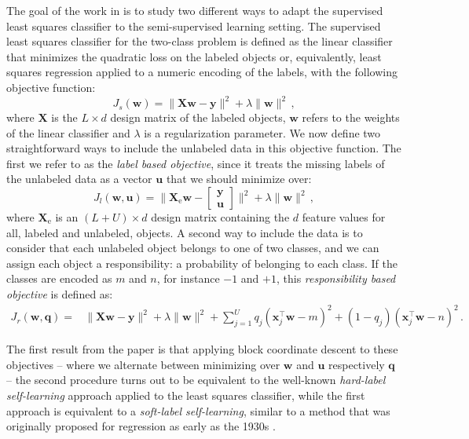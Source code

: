 \documentclass[twoside]{memoir}\usepackage[]{graphicx}\usepackage{xcolor}
\renewcommand{\cite}{\citep}
\newcommand{\Xe}{\mathbf{X}_\mathrm{e}  }
\begin{document}
The goal of the work in \cite{Krijthe2016a} is to study two different ways to adapt the supervised least squares classifier to the semi-supervised learning setting. The supervised least squares classifier for the two-class problem is defined as the linear classifier that minimizes the quadratic loss on the labeled objects or, equivalently, least squares regression applied to a numeric encoding of the labels, with the following objective function:
\begin{equation}
J_s(\mathbf{w}) = \| \mathbf{X} \mathbf{w}-\mathbf{y} \|^2 + \lambda \|\mathbf{w} \|^2 \,, \nonumber
\end{equation}
where $\mathbf{X}$ is the $L \times d$ design matrix of the labeled objects, $\mathbf{w}$ refers to the weights of the linear classifier and $\lambda$ is a regularization parameter. We now define two straightforward ways to include the unlabeled data in this objective function. The first we refer to as the \emph{label based objective}, since it treats the missing labels of the unlabeled data as a vector $\mathbf{u}$ that we should minimize over:
$$
J_l(\mathbf{w},\mathbf{u}) = \| \Xe \mathbf{w}-\begin{bmatrix} \mathbf{y} \\ \mathbf{u} \end{bmatrix} \|^2 + \lambda \|\mathbf{w} \|^2 \,,
$$
where $\Xe$ is an $(L+U) \times d$ design matrix containing the $d$ feature values for all, labeled and unlabeled, objects.
A second way to include the data is to consider that each unlabeled object belongs to one of two classes, and we can assign each object a responsibility: a probability of belonging to each class. If the classes are encoded as $m$ and $n$, for instance $-1$ and $+1$, this \emph{responsibility based objective} is defined as:
\begin{align}
J_r(\mathbf{w},\mathbf{q}) = & \| \mathbf{X} \mathbf{w}-\mathbf{y} \|^2 + \lambda \|\mathbf{w} \|^2 \nonumber + \sum_{j=1}^{U}  q_j (\mathbf{x}_j^\top \mathbf{w} - m)^2  + (1-q_j) (\mathbf{x}_j^\top \mathbf{w} - n)^2 \,. \nonumber
\end{align}

The first result from the paper is that applying block coordinate descent to these objectives -- where we alternate between minimizing over $\mathbf{w}$ and $\mathbf{u}$ respectively $\mathbf{q}$ -- the second procedure turns out to be equivalent to the well-known \emph{hard-label self-learning} approach applied to the least squares classifier, while the first approach is equivalent to a \emph{soft-label self-learning}, similar to a method that was originally proposed for regression as early as the 1930s \cite{Healy1956}.
\end{document}
